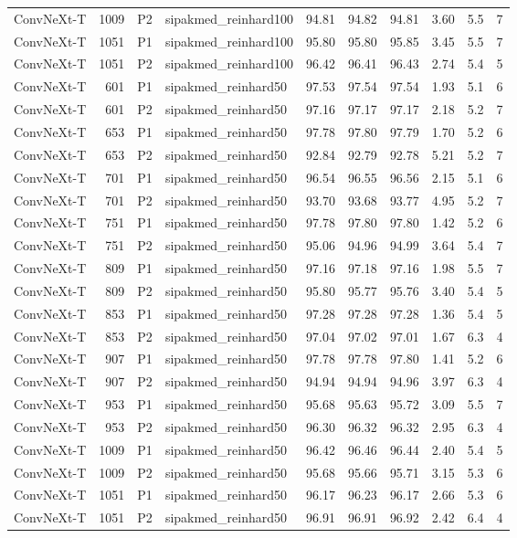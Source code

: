 {\begin{longtable}{lrllrrrrrr}
ConvNeXt-T & 1009 & P2 & sipakmed\_reinhard100 & 94.81 & 94.82 & 94.81 & 3.60 & 5.5 & 7 \\
ConvNeXt-T & 1051 & P1 & sipakmed\_reinhard100 & 95.80 & 95.80 & 95.85 & 3.45 & 5.5 & 7 \\
ConvNeXt-T & 1051 & P2 & sipakmed\_reinhard100 & 96.42 & 96.41 & 96.43 & 2.74 & 5.4 & 5 \\
ConvNeXt-T & 601 & P1 & sipakmed\_reinhard50 & 97.53 & 97.54 & 97.54 & 1.93 & 5.1 & 6 \\
ConvNeXt-T & 601 & P2 & sipakmed\_reinhard50 & 97.16 & 97.17 & 97.17 & 2.18 & 5.2 & 7 \\
ConvNeXt-T & 653 & P1 & sipakmed\_reinhard50 & 97.78 & 97.80 & 97.79 & 1.70 & 5.2 & 6 \\
ConvNeXt-T & 653 & P2 & sipakmed\_reinhard50 & 92.84 & 92.79 & 92.78 & 5.21 & 5.2 & 7 \\
ConvNeXt-T & 701 & P1 & sipakmed\_reinhard50 & 96.54 & 96.55 & 96.56 & 2.15 & 5.1 & 6 \\
ConvNeXt-T & 701 & P2 & sipakmed\_reinhard50 & 93.70 & 93.68 & 93.77 & 4.95 & 5.2 & 7 \\
ConvNeXt-T & 751 & P1 & sipakmed\_reinhard50 & 97.78 & 97.80 & 97.80 & 1.42 & 5.2 & 6 \\
ConvNeXt-T & 751 & P2 & sipakmed\_reinhard50 & 95.06 & 94.96 & 94.99 & 3.64 & 5.4 & 7 \\
ConvNeXt-T & 809 & P1 & sipakmed\_reinhard50 & 97.16 & 97.18 & 97.16 & 1.98 & 5.5 & 7 \\
ConvNeXt-T & 809 & P2 & sipakmed\_reinhard50 & 95.80 & 95.77 & 95.76 & 3.40 & 5.4 & 5 \\
ConvNeXt-T & 853 & P1 & sipakmed\_reinhard50 & 97.28 & 97.28 & 97.28 & 1.36 & 5.4 & 5 \\
ConvNeXt-T & 853 & P2 & sipakmed\_reinhard50 & 97.04 & 97.02 & 97.01 & 1.67 & 6.3 & 4 \\
ConvNeXt-T & 907 & P1 & sipakmed\_reinhard50 & 97.78 & 97.78 & 97.80 & 1.41 & 5.2 & 6 \\
ConvNeXt-T & 907 & P2 & sipakmed\_reinhard50 & 94.94 & 94.94 & 94.96 & 3.97 & 6.3 & 4 \\
ConvNeXt-T & 953 & P1 & sipakmed\_reinhard50 & 95.68 & 95.63 & 95.72 & 3.09 & 5.5 & 7 \\
ConvNeXt-T & 953 & P2 & sipakmed\_reinhard50 & 96.30 & 96.32 & 96.32 & 2.95 & 6.3 & 4 \\
ConvNeXt-T & 1009 & P1 & sipakmed\_reinhard50 & 96.42 & 96.46 & 96.44 & 2.40 & 5.4 & 5 \\
ConvNeXt-T & 1009 & P2 & sipakmed\_reinhard50 & 95.68 & 95.66 & 95.71 & 3.15 & 5.3 & 6 \\
ConvNeXt-T & 1051 & P1 & sipakmed\_reinhard50 & 96.17 & 96.23 & 96.17 & 2.66 & 5.3 & 6 \\
ConvNeXt-T & 1051 & P2 & sipakmed\_reinhard50 & 96.91 & 96.91 & 96.92 & 2.42 & 6.4 & 4 \\
\end{longtable}
}
